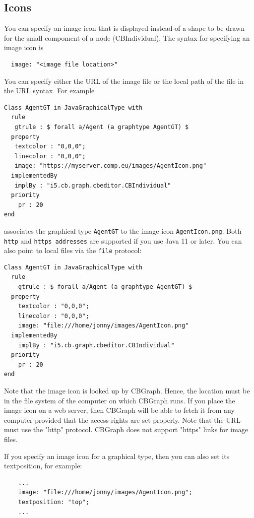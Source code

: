 \subsection{Icons}
\label{sec:icons}

You can specify an image icon that is displayed instead of a shape to be drawn for the
small compoment of a node (CBIndividual). The syntax for specifying an image icon is

{\small
\begin{verbatim}
  image: "<image file location>"
\end{verbatim}
}

You can specify either the URL of the image file or the local path of the file in the URL syntax.
For example

{\small
\begin{verbatim}
Class AgentGT in JavaGraphicalType with
  rule
   gtrule : $ forall a/Agent (a graphtype AgentGT) $
  property
   textcolor : "0,0,0";
   linecolor : "0,0,0";
   image: "https://myserver.comp.eu/images/AgentIcon.png"
  implementedBy
   implBy : "i5.cb.graph.cbeditor.CBIndividual"
  priority
    pr : 20
end
\end{verbatim}
}

associates the graphical type {\tt AgentGT} to the image icon {\tt AgentIcon.png}.
Both {\tt http} and {\tt https addresses} are supported if you use Java 11 or later.
You can also point to local files via the {\tt file} protocol:

{\small
\begin{verbatim}
Class AgentGT in JavaGraphicalType with
  rule
    gtrule : $ forall a/Agent (a graphtype AgentGT) $
  property
    textcolor : "0,0,0";
    linecolor : "0,0,0";
    image: "file:///home/jonny/images/AgentIcon.png"
  implementedBy
    implBy : "i5.cb.graph.cbeditor.CBIndividual"
  priority
    pr : 20
end
\end{verbatim}
}

Note that the image icon is looked up by CBGraph. Hence, the location must be 
in the file system of the computer on which CBGraph runs. If you place the image
icon on a web server, then CBGraph will be able to fetch it from any computer
provided that the access rights are set properly. Note that the URL must use the "http"
protocol. CBGraph does not support "https" links for image files.

If you specify an image icon for a graphical type, then you can also set its
textposition, for example:

{\small
\begin{verbatim}
    ...
    image: "file:///home/jonny/images/AgentIcon.png";
    textposition: "top";
    ...
\end{verbatim}
}

